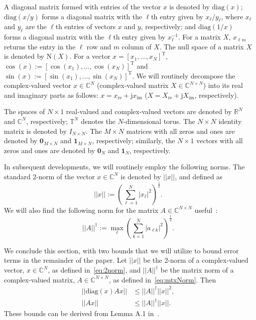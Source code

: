\documentclass[10 pt, conference]{ieeeconf}
\begin{document}
A diagonal matrix formed with entries of the vector $x$ is denoted by $\mathrm{diag}(x)$;  
$\mathrm{diag}(x/y)$ forms a diagonal matrix with the $\ell$th entry given by $x_\ell/y_\ell$, where $x_\ell$ and $y_\ell$ are the $\ell$th entries of vectors $x$ and $y$, respectively; and $\mathrm{diag}(1/x)$ forms a diagonal matrix with the $\ell$th entry given by $x_\ell^{-1}$. For a matrix $X$, $x_{\ell m}$ returns the entry in the $\ell$ row and $m$ column of $X$. The null space of a matrix $X$ is denoted by $\mathrm{N}(X)$. For a vector $x=[x_1,\dots,x_N]^\mathrm T$, $\cos(x):= [\cos(x_1),\dots,\cos(x_N)]^\mathrm T$ and $\sin(x):= [\sin(x_1),\dots,\sin(x_N)]^\mathrm T$. We will routinely decompose the complex-valued vector $x \in \mathbb{C}^N$ (complex-valued matrix $X \in \mathbb{C}^{N \times N}$) into its real and imaginary parts as follows: $x = x_\mathrm{re} + \mathrm j x_\mathrm{im}$ ($X = X_\mathrm{re} + \mathrm j X_\mathrm{im}$, respectively). 

The spaces of $N\times1$ real-valued and complex-valued vectors are denoted by $\mathbb{R}^N$ and $\mathbb{C}^N$, respectively; $\mathbb{T}^N$ denotes the $N$-dimensional torus. 
The $N \times N$ identity matrix is denoted by $I_{N\times N}$. The $M \times N$ matrices with all zeros and ones are denoted by $\mathbf{0}_{M\times N}$ and $\mathbf{1}_{M\times N}$, respectively; similarly, the $N \times 1$ vectors with all zeros and ones are denoted by $\mathbf{0}_{N}$ and $\mathbf{1}_{N}$, respectively. 

In subsequent developments, we will routinely employ the following norms. The standard $2$-norm of the vector $x \in \mathbb{C}^N$ is denoted by $||x||$, and defined as
\begin{equation}
||x|| := \left( \sum_{\ell=1}^N |x_\ell|^2 \right)^{\frac{1}{2}}.
\label{eq:2norm}
\end{equation}
We will also find the following norm for the matrix $A \in \mathbb{C}^{N \times N}$ useful~\cite{Bolognani-2015}:
\begin{equation}
||A||^\dagger := \max_\ell \left( \sum_{k=1}^N |a_{\ell k}|^2 \right)^{\frac{1}{2}}.
\label{eq:mtxNorm}
\end{equation}

We conclude this section, with two bounds that we will utilize to bound error terms in the remainder of the paper. Let $||x||$ be the 2-norm of a complex-valued vector, $x \in \mathbb{C}^N$, as defined in~\eqref{eq:2norm}, and $||A||^\dagger$ be the matrix norm of a complex-valued matrix, $A \in \mathbb{C}^{N \times N}$, as defined in~\eqref{eq:mtxNorm}.  Then
\begin{align}
||\mathrm{diag} (x) A x|| &\leq ||A||^\dagger ||x||^2, \label{eq:bound1} \\ 
||A x|| &\leq ||A||^\dagger ||x||. \label{eq:bound2}
\end{align}
These bounds can be derived from Lemma A.1 in~\cite{Bolognani-2015}.
\end{document}
